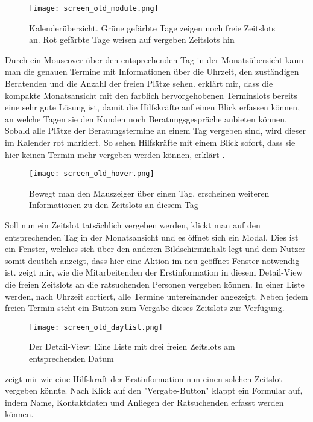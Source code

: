 \begin{figure}[h]
    \caption{Kalenderübersicht. Grüne gefärbte Tage zeigen noch freie Zeitslots an. Rot gefärbte Tage weisen auf vergeben Zeitslots hin}
    \centering
    \texttt{[image: screen\_old\_module.png]}
\end{figure}

Durch ein Mouseover über den entsprechenden Tag in der Monatsübersicht kann man
die genauen Termine mit Informationen über die Uhrzeit, den zuständigen
Beratenden und die Anzahl der freien Plätze sehen. \ipName erklärt mir, dass
die kompakte Monatsansicht mit den farblich hervorgehobenen Terminslots bereits
eine sehr gute Lösung ist, damit die Hilfskräfte auf einen Blick erfassen
können, an welche Tagen sie den Kunden noch Beratungsgespräche anbieten können.
Sobald alle Plätze der Beratungstermine an einem Tag vergeben sind, wird dieser
im Kalender rot markiert. \glqq So sehen Hilfskräfte mit einem Blick sofort,
dass sie hier keinen Termin mehr vergeben werden können\grqq, erklärt \ipName
\cite{claves}.

\begin{figure}[h]
    \caption{Bewegt man den Mauszeiger über einen Tag, erscheinen weiteren Informationen zu den Zeitslots an diesem Tag}
    \centering
    \texttt{[image: screen\_old\_hover.png]}
\end{figure}

Soll nun ein Zeitslot tatsächlich vergeben werden, klickt man auf den
entsprechenden Tag in der Monatsansicht und es öffnet sich ein Modal. Dies ist
ein Fenster, welches sich über den anderen Bildschirminhalt legt und dem Nutzer
somit deutlich anzeigt, dass hier eine Aktion im neu geöffnet Fenster notwendig
ist. \ipName zeigt mir, wie die Mitarbeitenden der Erstinformation in diesem
Detail-View die freien Zeitslots an die ratsuchenden Personen vergeben können.
In einer Liste werden, nach Uhrzeit sortiert, alle Termine untereinander
angezeigt. Neben jedem freien Termin steht ein Button zum Vergabe dieses
Zeitslots zur Verfügung.

\begin{figure}[h]
    \caption{Der Detail-View: Eine Liste mit drei freien Zeitslots am entsprechenden Datum}
    \centering
    \texttt{[image: screen\_old\_daylist.png]}
\end{figure}

\ipName zeigt mir wie eine Hilfskraft der Erstinformation nun einen solchen
Zeitslot vergeben könnte. Nach Klick auf den "Vergabe-Button" klappt ein
Formular auf, indem Name, Kontaktdaten und Anliegen der Ratsuchenden erfasst
werden können.

